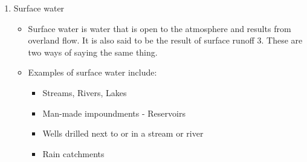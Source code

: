 \begin{itemize}
\begin{enumerate}
\item Surface water\\
\begin{itemize}
\item Surface water is water that is open to the atmosphere and results from overland flow. It is also said to be the result of surface runoff 3. These are two ways of saying the same thing.
\item Examples of surface water include:
\begin{itemize}
\item Streams, Rivers, Lakes
\item Man-made impoundments - Reservoirs
\item Wells drilled next to or in a stream or river
\item Rain catchments
\end{itemize}


\end{itemize}
\end{enumerate}
\end{itemize}
